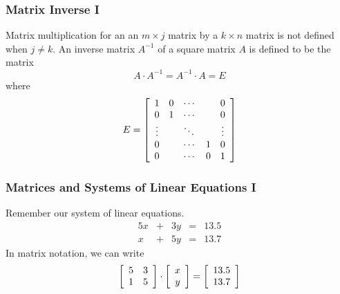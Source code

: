 \documentclass[xcolor=dvipsnames]{beamer}
\begin{document}
\begin{frame}
  \frametitle{Matrix Inverse I}
  Matrix multiplication for an an $m\times{}j$ matrix by a
  $k\times{}n$ matrix is not defined when $j\neq{}k$. An inverse
  matrix $A^{-1}$ of a square matrix $A$ is defined to be the matrix
\begin{equation}
  \label{eq:vaishien}
A\cdot{}A^{-1}=A^{-1}\cdot{}A=E
\end{equation}
where
\begin{equation}
  \label{eq:phoaxoze}
  E=\left[\begin{array}{ccccc}
     1        & 0 & \cdots{} &   & 0      \\
     0        & 1 & \cdots{} &   & 0      \\
     \vdots{} &   & \ddots{} &   & \vdots \\
     0        &   & \cdots{} & 1 & 0      \\
     0        &   & \cdots{} & 0 & 1
  \end{array}\right]\notag
\end{equation}
\end{frame}

\begin{frame}
  \frametitle{Matrices and Systems of Linear Equations I}
Remember our system of linear equations. 
  \begin{equation}
    \label{eq:ahgohcoh}
    \begin{array}{rcrcl}
      5x & + & 3y & = & 13.5 \\
      x  & + & 5y & = & 13.7
    \end{array}
  \end{equation}
In matrix notation, we can write
  \begin{equation}
    \label{eq:neithohn}
  \left[\begin{array}{cc}
5        & 3                 \\
 1       & 5
  \end{array}\right]\cdot
  \left[\begin{array}{c}
 x                 \\
 y
  \end{array}\right]=
  \left[\begin{array}{c}
13.5                 \\
13.7
  \end{array}\right]\notag
  \end{equation}
\end{frame}
\end{document}
